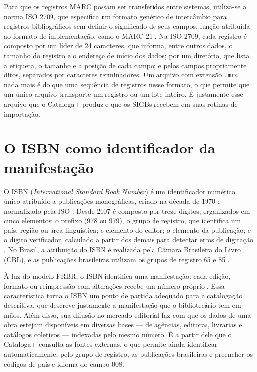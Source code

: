 Para que os registros MARC possam ser transferidos entre sistemas, utiliza-se a norma ISO 2709, que especifica um formato genérico de intercâmbio para registros bibliográficos sem definir o significado de seus campos, função atribuída ao formato de implementação, como o MARC 21 \cite{iso2709}. Na ISO 2709, cada registro é composto por um líder de 24 caracteres, que informa, entre outros dados, o tamanho do registro e o endereço de início dos dados; por um diretório, que lista a etiqueta, o tamanho e a posição de cada campo; e pelos campos propriamente ditos, separados por caracteres terminadores. Um arquivo com extensão \texttt{.mrc} nada mais é do que uma sequência de registros nesse formato, o que permite que um único arquivo transporte um registro ou um lote inteiro. É justamente esse arquivo que o Cataloga+ produz e que os SIGBs recebem em suas rotinas de importação.

\section{O ISBN como identificador da manifestação}
\label{sec:isbn}

O ISBN (\textit{International Standard Book Number}) é um identificador numérico único atribuído a publicações monográficas, criado na década de 1970 e normalizado pela ISO \cite{isbn2017}. Desde 2007 é composto por treze dígitos, organizados em cinco elementos: o prefixo (978 ou 979), o grupo de registro, que identifica um país, região ou área linguística; o elemento do editor; o elemento da publicação; e o dígito verificador, calculado a partir dos demais para detectar erros de digitação \cite{isbn2017}. No Brasil, a atribuição do ISBN é realizada pela Câmara Brasileira do Livro (CBL), e as publicações brasileiras utilizam os grupos de registro 65 e 85 \cite{cbl2021}.

À luz do modelo FRBR, o ISBN identifica uma manifestação: cada edição, formato ou reimpressão com alterações recebe um número próprio \cite{ifla1998frbr}. Essa característica torna o ISBN um ponto de partida adequado para a catalogação descritiva, que descreve justamente a manifestação que o bibliotecário tem em mãos. Além disso, sua difusão no mercado editorial faz com que os dados de uma obra estejam disponíveis em diversas bases --- de agências, editoras, livrarias e catálogos coletivos --- indexadas pelo mesmo número. É a partir dele que o Cataloga+ consulta as fontes externas, o que permite ainda identificar automaticamente, pelo grupo de registro, as publicações brasileiras e preencher os códigos de país e idioma do campo 008.

